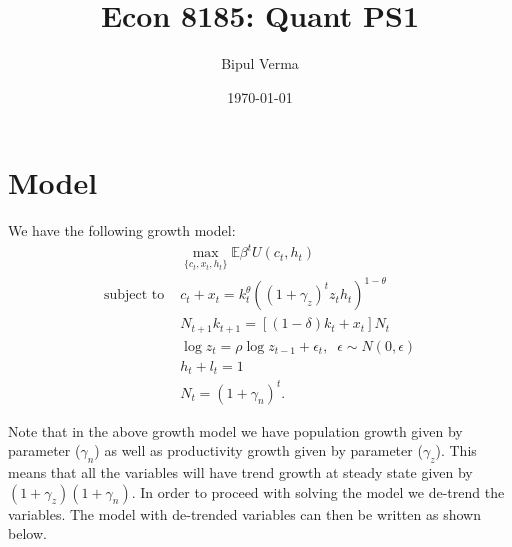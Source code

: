 \documentclass[12pt]{article}
\begin{document}

\title{Econ 8185: Quant PS1}
\author{Bipul Verma}
\date{\today}
\maketitle


\vspace{8cm}



\newpage

\section{Model}
We have the following growth model: 
\begin{align*}
	& \max_{\{c_t, x_t, h_t\}} \mathbb{E} \beta^t U(c_t, h_t) \\
	\text{subject to } & c_t + x_t = k_t^\theta((1+\gamma_z)^tz_th_t)^{1-\theta} \\
	& N_{t+1}k_{t+1} = [(1-\delta)k_t + x_t]N_t \\
	& \log z_t = \rho \log z_{t-1} + \epsilon_t, \; \; \epsilon\sim N(0, \epsilon)\\
	& h_t + l_t =1\\
	& N_t = (1+\gamma_n)^t .
\end{align*}

Note that in the above growth model we have population growth given by parameter ($\gamma_n$) as well as productivity growth given by parameter ($\gamma_z$). This means that all the variables will have trend growth at steady state given by $(1+\gamma_z)(1+\gamma_n).$ In order to proceed with solving the model we de-trend the variables. The model with de-trended variables can then be written as shown below.
\end{document}
